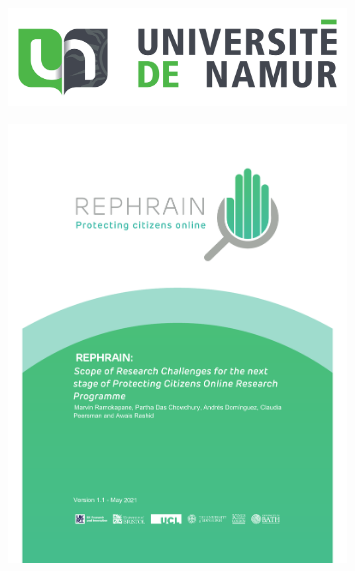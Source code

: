 \documentclass[final]{beamer}
\newlength{\leftcolwidth}
\newlength{\rightcolwidth}
\begin{document}
\begin{frame}[t]
\begin{columns}[t]
\begin{column}{\leftcolwidth}
\begin{minipage}[t]{0.32\rightcolwidth}
  \begin{figure}
    \centering
    \includegraphics[width=0.8\textwidth]{images/unamur-logo.jpeg}
  \end{figure}
  \end{minipage}
  \hfill
  \begin{minipage}[t]{0.33\rightcolwidth}
\vspace{-1cm}
   \begin{figure}
     \centering
      \includegraphics[width=0.8\textwidth]{images/REPHRAIN-logo.pdf}
  \end{figure}
  \end{minipage}



\end{column}
\end{columns}
\end{frame}
\end{document}
